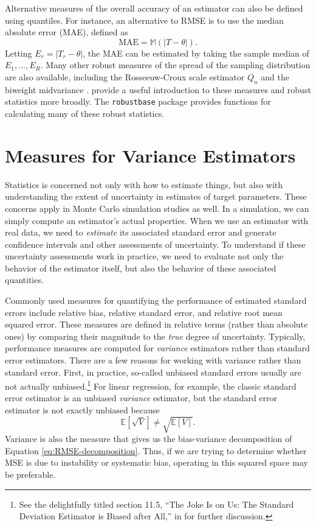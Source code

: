 \documentclass[
]{book}
\newcommand{\E}{\mathbb{E}}
\newcommand{\M}{\mathbb{M}}
\begin{document}
Alternative measures of the overall accuracy of an estimator can also be defined using quantiles.
For instance, an alternative to RMSE is to use the median absolute error (MAE), defined as
\[
\text{MAE} = \M\left(\left|T - \theta\right|\right).
\label{eq:MAE}
\]
Letting \(E_r = |T_r - \theta|\), the MAE can be estimated by taking the sample median of \(E_1,...,E_R\).
Many other robust measures of the spread of the sampling distribution are also available, including the Rosseeuw-Croux scale estimator \(Q_n\) \citep{Rousseeuw1993alternatives} and the biweight midvariance \citep{Wilcox2022introduction}.
\citet{Maronna2006robust} provide a useful introduction to these measures and robust statistics more broadly.
The \texttt{robustbase} package \citep{robustbase} provides functions for calculating many of these robust statistics.

\section{Measures for Variance Estimators}\label{measures-for-variance-estimators}

Statistics is concerned not only with how to estimate things, but also with understanding the extent of uncertainty in estimates of target parameters.
These concerns apply in Monte Carlo simulation studies as well.
In a simulation, we can simply compute an estimator's actual properties.
When we use an estimator with real data, we need to \emph{estimate} its associated standard error and generate confidence intervals and other assessments of uncertainty.
To understand if these uncertainty assessments work in practice, we need to evaluate not only the behavior of the estimator itself, but also the behavior of these associated quantities.

Commonly used measures for quantifying the performance of estimated standard errors include relative bias, relative standard error, and relative root mean squared error.
These measures are defined in relative terms (rather than absolute ones) by comparing their magnitude to the \emph{true} degree of uncertainty.
Typically, performance measures are computed for \emph{variance} estimators rather than standard error estimators.
There are a few reasons for working with variance rather than standard error.
First, in practice, so-called unbiased standard errors usually are not actually unbiased.\footnote{See the delightfully titled section 11.5, ``The Joke Is on Us: The Standard Deviation Estimator is Biased after All,'' in \citet{westfall2013understanding} for further discussion.}
For linear regression, for example, the classic standard error estimator is an unbiased \emph{variance} estimator, but the standard error estimator is not exactly unbiased because
\[ 
\E[ \sqrt{ V } ] \neq \sqrt{ \E[ V ] }.
\]
Variance is also the measure that gives us the bias-variance decomposition of Equation \eqref{eq:RMSE-decomposition}. Thus, if we are trying to determine whether MSE is due to instability or systematic bias, operating in this squared space may be preferable.
\end{document}
